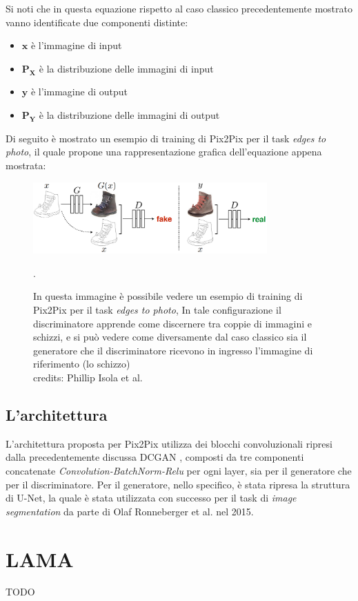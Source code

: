 Si noti che in questa equazione rispetto al caso classico precedentemente mostrato vanno identificate due componenti distinte:
\begin{itemize}
    \item $\mathbf{x}$ è l'immagine di input
    \item $\mathbf{P_X}$ è la distribuzione delle immagini di input
    \item $\mathbf{y}$  è l'immagine di output
    \item $\mathbf{P_Y}$ è la distribuzione delle immagini di output
\end{itemize}

Di seguito è mostrato un esempio di training di Pix2Pix per il task \textit{edges to photo}, il quale propone una rappresentazione grafica
dell'equazione appena mostrata:

    \begin{figure}[H]
        \centering
        \includegraphics[width=0.8\textwidth]{imgs/pix2pix_train.png}
        \caption{In questa immagine è possibile vedere un esempio di training di Pix2Pix per il task \textit{edges to photo},
        In tale configurazione il discriminatore apprende come discernere tra coppie di immagini e schizzi, e si può vedere come diversamente
        dal caso classico sia il generatore che il discriminatore ricevono in ingresso l'immagine di riferimento (lo schizzo)\\
        credits: Phillip Isola et al. \cite{isola2018imagetoimage}}.
        \label{fig:pix2pix}
    \end{figure}


\subsection{L'architettura}
L'architettura proposta per Pix2Pix utilizza dei blocchi convoluzionali ripresi dalla precedentemente discussa DCGAN \cite{radford2016unsupervised},
composti da tre componenti concatenate \textit{Convolution-BatchNorm-Relu} per ogni layer, sia per il generatore che per il discriminatore.
Per il generatore, nello specifico, è stata ripresa la struttura di U-Net, la quale è stata utilizzata con successo per il task di \textit{image segmentation}
da parte di Olaf Ronneberger et al. \cite{ronneberger2015unet} nel 2015.

\section{LAMA}
TODO


